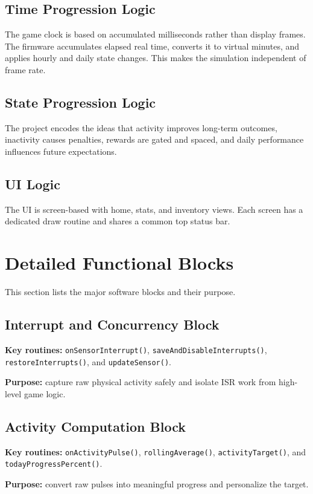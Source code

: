 \documentclass[conference]{IEEEtran}
\begin{document}
\subsection{Time Progression Logic}
The game clock is based on accumulated milliseconds rather than display frames. The firmware accumulates elapsed real time, converts it to virtual minutes, and applies hourly and daily state changes. This makes the simulation independent of frame rate.

\subsection{State Progression Logic}
The project encodes the ideas that activity improves long-term outcomes, inactivity causes penalties, rewards are gated and spaced, and daily performance influences future expectations.

\subsection{UI Logic}
The UI is screen-based with home, stats, and inventory views. Each screen has a dedicated draw routine and shares a common top status bar.

\section{Detailed Functional Blocks}
This section lists the major software blocks and their purpose.

\subsection{Interrupt and Concurrency Block}
\textbf{Key routines:} \texttt{onSensorInterrupt()}, \texttt{saveAndDisableInterrupts()}, \texttt{restoreInterrupts()}, and \texttt{updateSensor()}.

\textbf{Purpose:} capture raw physical activity safely and isolate ISR work from high-level game logic.

\subsection{Activity Computation Block}
\textbf{Key routines:} \texttt{onActivityPulse()}, \texttt{rollingAverage()}, \texttt{activityTarget()}, and \texttt{todayProgressPercent()}.

\textbf{Purpose:} convert raw pulses into meaningful progress and personalize the target.
\end{document}
